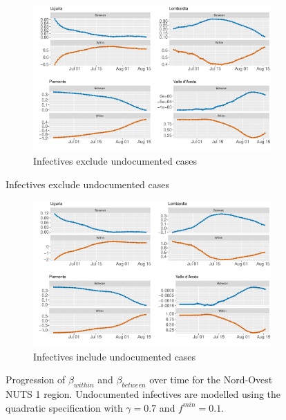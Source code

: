 \documentclass[12pt]{article}
\begin{document}
    \begin{figure}[H]
	    \centering
	    \begin{subfigure}{\textwidth}
	      \centering
	      \includegraphics[width=0.94\linewidth]{output/model_between_lag14_betas_Nord-Ovest_rolling.pdf}
	      \caption{Infectives exclude undocumented cases}
	      \label{fig:beta_between_over_time_nordovest_regular}
	    \end{subfigure}
    \end{figure}
    \begin{figure}[H]\ContinuedFloat
	    \begin{subfigure}{\textwidth}
	      \centering
	      \includegraphics[width=0.94\linewidth]{output/model_between_lag14_betas_Nord-Ovest_UndocQuadratic_rolling.pdf}
	      \caption{Infectives include undocumented cases}
	      \label{fig:beta_between_over_time_nordovest_regular_undoc}
	    \end{subfigure}
	    \caption{Progression of $\beta_{within}$ and $\beta_{between}$ over time for the Nord-Ovest NUTS 1 region. Undocumented infectives are modelled using the quadratic specification with $\gamma = 0.7$ and $f^{min}=0.1$.}
	    \label{fig:beta_between_over_time_nordovest}
    \end{figure}
	
\end{document}
